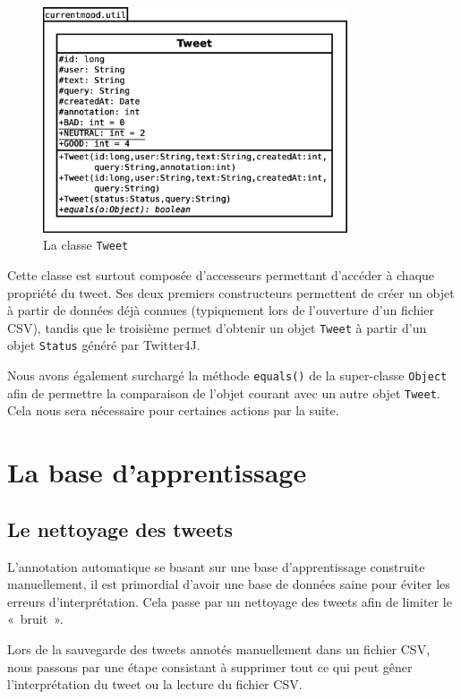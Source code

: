 \documentclass[12pt,a4paper]{report}
\begin{document}
\begin{figure}
	\centering
	\includegraphics[width=9cm]{img/uml_tweet.eps}
	\caption{La classe \texttt{Tweet}}
	\label{uml_tweet}
\end{figure}

Cette classe est surtout composée d'accesseurs permettant d'accéder à chaque
propriété du tweet. Ses deux premiers constructeurs permettent de créer un objet
à partir de données déjà connues (typiquement lors de l'ouverture d'un fichier
CSV), tandis que le troisième permet d'obtenir un objet \texttt{Tweet} à partir
d'un objet \texttt{Status} généré par Twitter4J.

Nous avons également surchargé la méthode \texttt{equals()} de la super-classe
\texttt{Object} afin de permettre la comparaison de l'objet courant avec un
autre objet \texttt{Tweet}. Cela nous sera nécessaire pour certaines actions par
la suite.

\chapter{La base d'apprentissage}

\section{Le nettoyage des tweets}

L'annotation automatique se basant sur une base d'apprentissage construite
manuellement, il est primordial d'avoir une base de données saine pour éviter
les erreurs d'interprétation. Cela passe par un nettoyage des tweets afin de
limiter le «~bruit~».

Lors de la sauvegarde des tweets annotés manuellement dans un fichier CSV, nous
passons par une étape consistant à supprimer tout ce qui peut gêner
l'interprétation du tweet ou la lecture du fichier CSV.
\end{document}
